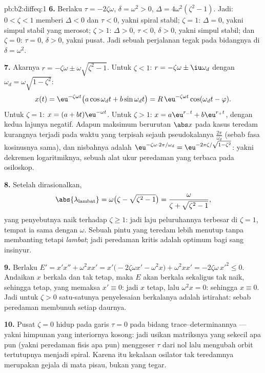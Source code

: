 \begin{solution}{pb:b2:diffeq:1}
\textbf{6.} Berlaku $\tau = -2\zeta\omega$, $\delta = \omega^2 > 0$,
$\Delta = 4\omega^2(\zeta^2 - 1)$. Jadi: $0 < \zeta < 1$ memberi
$\Delta < 0$ dan $\tau < 0$, yakni spiral stabil; $\zeta = 1$: $\Delta =
0$, yakni simpul stabil yang merosot; $\zeta > 1$: $\Delta > 0$, $\tau <
0$, $\delta > 0$, yakni simpul stabil; dan $\zeta = 0$: $\tau = 0$,
$\delta > 0$, yakni pusat. Jadi sebuah perjalanan tegak pada bidangnya di
$\delta = \omega^2$.

\textbf{7.} Akarnya $r = -\zeta\omega \pm
\omega\sqrt{\zeta^2-1}$. Untuk $\zeta < 1$: $r = -\zeta\omega
\pm \iu\omega_d$ dengan $\omega_d = \omega\sqrt{1-\zeta^2}$:
\[
x(t) = \eu^{-\zeta\omega t}\bigl(a\cos\omega_dt +
b\sin\omega_dt\bigr)
= R\,\eu^{-\zeta\omega t}\cos(\omega_dt - \varphi) .
\]
Untuk $\zeta = 1$: $x = (a + bt)\eu^{-\omega t}$. Untuk $\zeta >
1$: $x = a\eu^{r_-t} + b\eu^{r_+t}$, dengan kedua lajunya negatif.
Adapun maksimum berurutan $\abs x$ pada kasus teredam kurangnya terjadi pada
waktu yang terpisah sejauh pseudokalanya $\frac{2\pi}{\omega_d}$
(sebab fasa kosinusnya sama), dan nisbahnya adalah
$\eu^{-\zeta\omega\cdot2\pi/\omega_d} =
\eu^{-2\pi\zeta/\sqrt{1-\zeta^2}}$: yakni dekremen logaritmiknya,
sebuah alat ukur peredaman yang terbaca pada osiloskop.

\textbf{8.} Setelah dirasionalkan,
\[
\abs{\lambda_{\mathrm{lambat}}} = \omega\bigl(\zeta -
\sqrt{\zeta^2-1}\bigr)
= \frac{\omega}{\zeta + \sqrt{\zeta^2 - 1}} ,
\]
yang penyebutnya naik terhadap $\zeta \geq 1$: jadi laju
peluruhannya terbesar di $\zeta = 1$, tempat ia sama dengan $\omega$. Sebuah
pintu yang teredam lebih menutup tanpa membanting tetapi \emph{lambat};
jadi peredaman kritis adalah optimum bagi sang insinyur.

\textbf{9.} Berlaku $E' = x'x'' + \omega^2xx' =
x'\bigl(-2\zeta\omega x' - \omega^2x\bigr) + \omega^2xx' =
-2\zeta\omega\,x'^2 \leq 0$. Andaikan $x$ berkala dan
tak tetap, maka $E$ akan berkala sekaligus tak naik, sehingga
tetap, yang memaksa $x' \equiv 0$: jadi $x$ tetap, lalu
$\omega^2x = 0$: sehingga $x \equiv 0$. Jadi untuk $\zeta > 0$ satu-satunya
penyelesaian berkalanya adalah istirahat: sebab peredaman membunuh setiap daurnya.

\textbf{10.} Pusat $\zeta = 0$ hidup pada garis $\tau =
0$ pada bidang trace--determinannya --- yakni himpunan yang interiornya
kosong: jadi usikan matriksnya yang sekecil apa pun
(yakni peredaman fisis apa pun) menggeser $\tau$ dari nol lalu mengubah
orbit tertutupnya menjadi spiral. Karena itu kekalaan osilator
tak teredamnya merupakan gejala di mata pisau, bukan yang tegar.


\end{solution}
